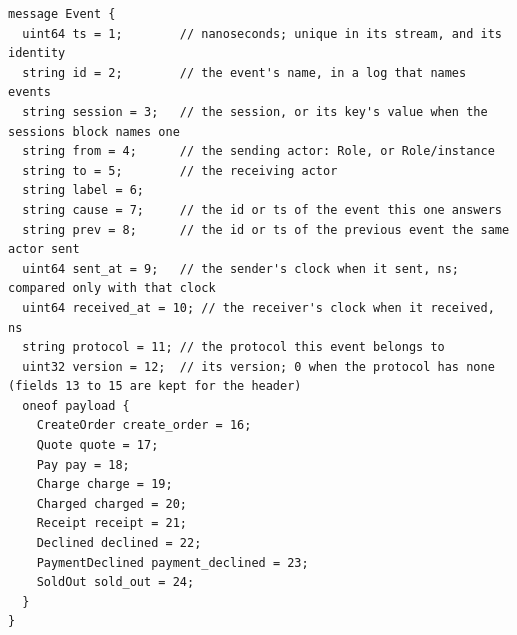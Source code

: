 \begin{lstlisting}[language={},basicstyle=\ttfamily\footnotesize,breaklines=true]
message Event {
  uint64 ts = 1;        // nanoseconds; unique in its stream, and its identity
  string id = 2;        // the event's name, in a log that names events
  string session = 3;   // the session, or its key's value when the sessions block names one
  string from = 4;      // the sending actor: Role, or Role/instance
  string to = 5;        // the receiving actor
  string label = 6;
  string cause = 7;     // the id or ts of the event this one answers
  string prev = 8;      // the id or ts of the previous event the same actor sent
  uint64 sent_at = 9;   // the sender's clock when it sent, ns; compared only with that clock
  uint64 received_at = 10; // the receiver's clock when it received, ns
  string protocol = 11; // the protocol this event belongs to
  uint32 version = 12;  // its version; 0 when the protocol has none (fields 13 to 15 are kept for the header)
  oneof payload {
    CreateOrder create_order = 16;
    Quote quote = 17;
    Pay pay = 18;
    Charge charge = 19;
    Charged charged = 20;
    Receipt receipt = 21;
    Declined declined = 22;
    PaymentDeclined payment_declined = 23;
    SoldOut sold_out = 24;
  }
}
\end{lstlisting}
